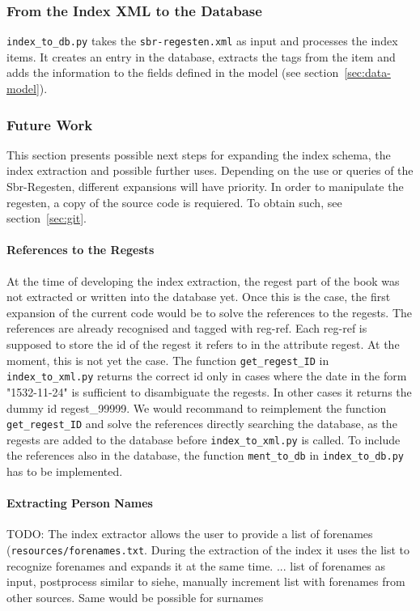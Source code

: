\subsubsection{From the Index XML to the Database}
\texttt{index\_to\_db.py} takes the \texttt{sbr-regesten.xml} as input and processes the index items. It creates an entry in the database, extracts the tags from the item and adds the information to the fields defined in the model (see section~\ref{sec:data-model}).





\subsubsection{Future Work}

This section presents possible next steps for expanding the index schema, the index extraction and possible further uses. Depending on the use or queries of the Sbr-Regesten, different expansions will have priority. In order to manipulate the regesten, a copy of the source code is requiered. To obtain such, see section~\ref{sec:git}.

\paragraph{References to the Regests}
At the time of developing the index extraction, the regest part of the book was not extracted or written into the database yet. Once this is the case, the first expansion of the current code would be to solve the references to the regests. The references are already recognised and tagged with reg-ref. Each reg-ref is supposed to store the id of the regest it refers to in the attribute regest. At the moment, this is not yet the case. The function \texttt{get\_regest\_ID} in \texttt{index\_to\_xml.py} returns the correct id only in cases where the date in the form "1532-11-24" is sufficient to disambiguate the regests. In other cases it returns the dummy id regest\_99999. We would recommand to reimplement the function \texttt{get\_regest\_ID} and solve the references directly searching the database, as the regests are added to the database before \texttt{index\_to\_xml.py} is called. To include the references also in the database, the function \texttt{ment\_to\_db} in \texttt{index\_to\_db.py} has to be implemented.

\paragraph{Extracting Person Names}
TODO: The index extractor allows the user to provide a list of forenames (\texttt{resources/forenames.txt}. During the extraction of the index it uses the list to recognize forenames and expands it at the same time. ...
list of forenames as input, postprocess similar to siehe, manually increment list with forenames from other sources. Same would be possible for surnames

